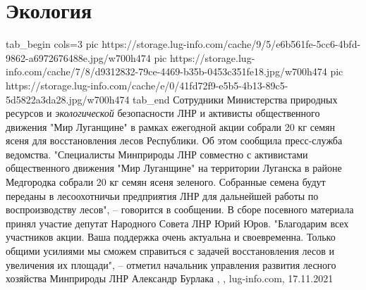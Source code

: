 
 
 
 
 
\chapter{Экология}

\ifcmt
  tab_begin cols=3
     pic https://storage.lug-info.com/cache/9/5/e6b561fe-5cc6-4bfd-9862-a6972676488e.jpg/w700h474
     pic https://storage.lug-info.com/cache/7/8/d9312832-79ce-4469-b35b-0453c351fe18.jpg/w700h474
		 pic https://storage.lug-info.com/cache/e/0/41fd72f9-e5b5-4b13-89c5-5d5822a3da28.jpg/w700h474
  tab_end
\fi
Сотрудники Министерства природных ресурсов и \emph{экологической} безопасности
ЛНР и активисты общественного движения "Мир Луганщине" в рамках ежегодной акции
собрали 20 кг семян ясеня для восстановления лесов Республики. Об этом сообщила
пресс-служба ведомства.  "Специалисты Минприроды ЛНР совместно с активистами
общественного движения "Мир Луганщине" на территории Луганска в районе
Медгородка собрали 20 кг семян ясеня зеленого. Собранные семена будут переданы
в лесоохотничьи предприятия ЛНР для дальнейшей работы по воспроизводству
лесов", – говорится в сообщении.  В сборе посевного материала принял участие
депутат Народного Совета ЛНР Юрий Юров.  "Благодарим всех участников акции.
Ваша поддержка очень актуальна и своевременна. Только общими усилиями мы сможем
справиться с задачей восстановления лесов и увеличения их площади", – отметил
начальник управления развития лесного хозяйства Минприроды ЛНР Александр
Бурлака
, 
, lug-info.com, 17.11.2021
